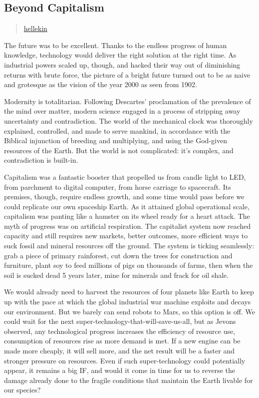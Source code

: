 \subsection{Beyond Capitalism}\label{beyond-capitalism}

\begin{quote}
\hyperlink{hellekin}{hellekin}
\end{quote}

The future was to be excellent. Thanks to the endless progress of human
knowledge, technology would deliver the right solution at the right
time. As industrial powers scaled up, though, and hacked their way out
of diminishing returns with brute force, the picture of a bright future
turned out to be as naive and grotesque as the vision of the year 2000
as seen from 1902.

Modernity is totalitarian. Following Descartes' proclamation of the
prevalence of the mind over matter, modern science engaged in a process
of stripping away uncertainty and contradiction. The world of the
mechanical clock was thoroughly explained, controlled, and made to serve
mankind, in accordance with the Biblical injunction of breeding and
multiplying, and using the God-given resources of the Earth. But the
world is not complicated: it's complex, and contradiction is built-in.

Capitalism was a fantastic booster that propelled us from candle light
to LED, from parchment to digital computer, from horse carriage to
spacecraft. Its premises, though, require endless growth, and some time
would pass before we could replicate our own spaceship Earth. As it
attained global operational scale, capitalism was panting like a hamster
on its wheel ready for a heart attack. The myth of progress was on
artificial respiration. The capitalist system now reached capacity and
still requires new markets, better outcomes, more efficient ways to suck
fossil and mineral resources off the ground. The system is ticking
seamlessly: grab a piece of primary rainforest, cut down the trees for
construction and furniture, plant soy to feed millions of pigs on
thousands of farms, then when the soil is sucked dead 5 years later,
mine for minerals and frack for oil shale.

We would already need to harvest the resources of four planets like
Earth to keep up with the pace at which the global industrial war
machine exploits and decays our environment. But we barely can send
robots to Mars, so this option is off. We could wait for the next
super-technology-that-will-save-us-all, but as Jevons observed, any
technological progress increases the efficiency of resource use,
consumption of resources rise as more demand is met. If a new engine can
be made more cheaply, it will sell more, and the net result will be a
faster and stronger pressure on resources. Even if such super-technology
could potentially appear, it remains a big IF, and would it come in time
for us to reverse the damage already done to the fragile conditions that
maintain the Earth livable for our species?

